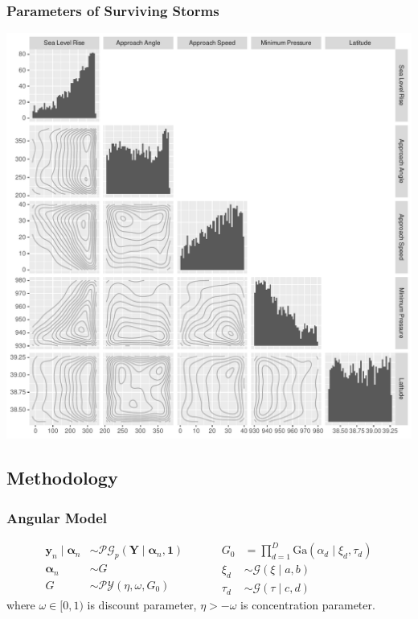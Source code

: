 \documentclass[aspectratio=169,10pt]{beamer}
\newlength{\frametextheight}
\begin{document}
\begin{frame}
    \frametitle{Parameters of Surviving Storms}
    \begin{center}
        \includegraphics[height=0.99\frametextheight]{./ch3/plots/threshold_pairs}
    \end{center}
\end{frame} %

\subsection{Methodology}

\begin{frame}
    \frametitle{Angular Model}
        \[
        \begin{aligned}
                \bm{y}_n \mid \bm{\alpha}_n &\sim
                    \mathcal{PG}_p\left(\bm{Y}\mid\bm{\alpha}_n,\bm{1}\right)\\
                \bm{\alpha}_n &\sim G\\
                G &\sim \mathcal{PY}\left(\eta, \omega, G_0\right)        
            \end{aligned}
            ~\hspace{1cm}
            \begin{aligned}
                G_0 &= {\textstyle\prod}_{d = 1}^{D}
                    \text{Ga}(\alpha_{d}\mid \xi_{d},\tau_{d})\\
                \xi_{d} &\sim \mathcal{G}(\xi\mid a, b)\\
                \tau_{d} &\sim \mathcal{G}(\tau\mid c, d)
            \end{aligned}
        \]
    where $\omega \in [0,1)$ is discount parameter, $\eta > -\omega$ is concentration parameter.
\end{frame} %
\end{document}
